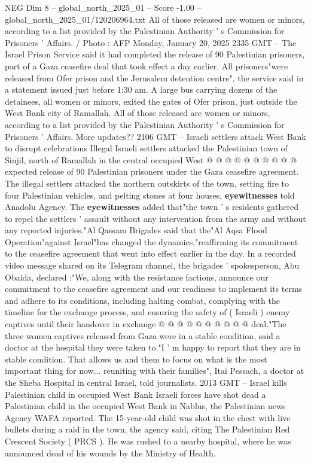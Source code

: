 \begin{textsample}{NEG Dim 8 – global\_north\_2025\_01 – Score -1.00 – global\_north\_2025\_01/120206964.txt}  \label{ex:f8_neg_161}
All of those released are women or minors, according to a list provided by the Palestinian Authority ' s Commission for Prisoners ' Affairs. / Photo : AFP Monday, January 20, 2025 2335 GMT -- The Israel Prison Service said it had completed the release of 90 Palestinian prisoners, part of a Gaza ceasefire deal that took effect a day earlier.
All prisoners"were released from Ofer prison and the Jerusalem detention centre", the service said in a statement issued just before 1:30 am.
A large bus carrying dozens of the detainees, all women or minors, exited the gates of Ofer prison, just outside the West Bank city of Ramallah.
All of those released are women or minors, according to a list provided by the Palestinian Authority ' s Commission for Prisoners ' Affairs.
More updates?? 2106 GMT -- Israeli settlers attack West Bank to disrupt celebrations Illegal Israeli settlers attacked the Palestinian town of Sinjil, north of Ramallah in the central occupied West @ @ @ @ @ @ @ @ @ @ expected release of 90 Palestinian prisoners under the Gaza ceasefire agreement.
The illegal settlers attacked the northern outskirts of the town, setting fire to four Palestinian vehicles, and pelting stones at four houses, \textbf{eyewitnesses} told Anadolu Agency.
The \textbf{eyewitnesses} added that"the town ' s residents gathered to repel the settlers ' assault without any intervention from the army and without any reported injuries."Al Qassam Brigades said that the"Al Aqsa Flood Operation"against Israel"has changed the dynamics,"reaffirming its commitment to the ceasefire agreement that went into effect earlier in the day.
In a recorded video message shared on its Telegram channel, the brigades ' spokesperson, Abu Obaida, declared :"We, along with the resistance factions, announce our commitment to the ceasefire agreement and our readiness to implement its terms and adhere to its conditions, including halting combat, complying with the timeline for the exchange process, and ensuring the safety of ( Israeli ) enemy captives until their handover in exchange @ @ @ @ @ @ @ @ @ @ deal."The three women captives released from Gaza were in a stable condition, said a doctor at the hospital they were taken to."I ' m happy to report that they are in stable condition.
That allows us and them to focus on what is the most important thing for now... reuniting with their families", Itai Pessach, a doctor at the Sheba Hospital in central Israel, told journalists. 2013 GMT -- Israel kills Palestinian child in occupied West Bank Israeli forces have shot dead a Palestinian child in the occupied West Bank in Nablus, the Palestinian news Agency WAFA reported.
The 15-year-old child was shot in the chest with live bullets during a raid in the town, the agency said, citing The Palestinian Red Crescent Society ( PRCS ).
He was rushed to a nearby hospital, where he was announced dead of his wounds by the Ministry of Health.

\end{textsample}
